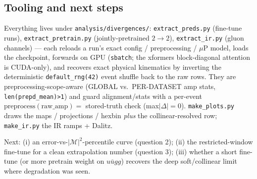 \subsection{Tooling and next steps}

Everything lives under \texttt{analysis/divergences/}: \texttt{extract\_preds.py}
(fine-tune runs), \texttt{extract\_pretrain.py} (jointly-pretrained $2\to2$),
\texttt{extract\_ir.py} (gluon channels) --- each reloads a run's exact config /
preprocessing / $\mu$P model, loads the checkpoint, forwards on GPU (\texttt{sbatch};
the xformers block-diagonal attention is CUDA-only), and recovers exact physical
kinematics by inverting the deterministic \texttt{default\_rng(42)} event shuffle back
to the raw rows.  They are preprocessing-scope-aware (GLOBAL vs.\ PER-DATASET amp
stats, \texttt{len(prepd\_mean)>1}) and guard alignment/stats with a per-event
$\mathrm{preprocess}(\mathrm{raw\_amp})=$ stored-truth check (max$|\Delta|=0$).
\texttt{make\_plots.py} draws the maps / projections / hexbin \emph{plus} the
collinear-resolved row; \texttt{make\_ir.py} the IR ramps + Dalitz.

Next: (i) an error-vs-$|\mathcal{M}|^2$-percentile curve (question 2); (ii) the
restricted-window fine-tune for a clean extrapolation number (question 3); (iii)
whether a short fine-tune (or more pretrain weight on $u\bar u gg$) recovers the deep
soft/collinear limit where degradation was seen.
